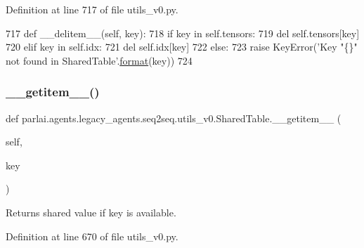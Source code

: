 Definition at line 717 of file utils\+\_\+v0.\+py.


\begin{DoxyCode}
717     \textcolor{keyword}{def }\_\_delitem\_\_(self, key):
718         \textcolor{keywordflow}{if} key \textcolor{keywordflow}{in} self.tensors:
719             del self.tensors[key]
720         \textcolor{keywordflow}{elif} key \textcolor{keywordflow}{in} self.idx:
721             del self.idx[key]
722         \textcolor{keywordflow}{else}:
723             \textcolor{keywordflow}{raise} KeyError(\textcolor{stringliteral}{'Key "\{\}" not found in SharedTable'}.\hyperlink{namespaceparlai_1_1chat__service_1_1services_1_1messenger_1_1shared__utils_a32e2e2022b824fbaf80c747160b52a76}{format}(key))
724 
\end{DoxyCode}
\mbox{\label{classparlai_1_1agents_1_1legacy__agents_1_1seq2seq_1_1utils__v0_1_1SharedTable_a0a5453d4cc84eb034e061f3fc53f7798}} 
\subsubsection{\texorpdfstring{\+\_\+\+\_\+getitem\+\_\+\+\_\+()}{\_\_getitem\_\_()}}
{\footnotesize\ttfamily def parlai.\+agents.\+legacy\+\_\+agents.\+seq2seq.\+utils\+\_\+v0.\+Shared\+Table.\+\_\+\+\_\+getitem\+\_\+\+\_\+ (\begin{DoxyParamCaption}\item[{}]{self,  }\item[{}]{key }\end{DoxyParamCaption})}

\begin{DoxyVerb}Returns shared value if key is available.
\end{DoxyVerb}
 

Definition at line 670 of file utils\+\_\+v0.\+py.


